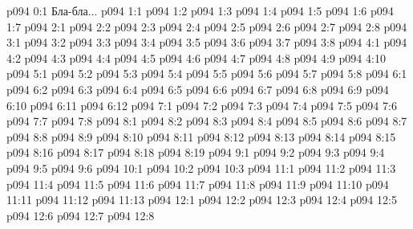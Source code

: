 \author{Мелхиседек}
\vs p094 0:1  Бла-бла...
\vs p094 1:1 
\vs p094 1:2 
\vs p094 1:3 
\vs p094 1:4 
\vs p094 1:5 \pc 
\vs p094 1:6 \pc 
\vs p094 1:7 
\vs p094 2:1 
\vs p094 2:2 
\vs p094 2:3 
\vs p094 2:4 
\vs p094 2:5 \pc 
\vs p094 2:6 \pc 
\vs p094 2:7 
\vs p094 2:8 \pc 
{}
\vs p094 3:1 
\vs p094 3:2 
\vs p094 3:3 
\vs p094 3:4 
\vs p094 3:5 
\vs p094 3:6 
\vs p094 3:7 
\vs p094 3:8 
\vs p094 4:1 
\vs p094 4:2 \pc 
\vs p094 4:3 
\vs p094 4:4 
\vs p094 4:5 
\vs p094 4:6 
\vs p094 4:7 
\vs p094 4:8 \pc 
\vs p094 4:9 
\vs p094 4:10 
\vs p094 5:1 
\vs p094 5:2 
\vs p094 5:3 
\vs p094 5:4 
\vs p094 5:5 
\vs p094 5:6 \pc 
\vs p094 5:7 
\vs p094 5:8 \pc 
{}
\vs p094 6:1 
\vs p094 6:2 
\vs p094 6:3 \pc 
\vs p094 6:4 
\vs p094 6:5 
\vs p094 6:6 
\vs p094 6:7 
\vs p094 6:8 
\vs p094 6:9 \pc 
\vs p094 6:10 
\vs p094 6:11 
\vs p094 6:12 
\vs p094 7:1 
\vs p094 7:2 
\vs p094 7:3 
\vs p094 7:4 
\vs p094 7:5 
\vs p094 7:6 
\vs p094 7:7 \pc 
\vs p094 7:8 
\vs p094 8:1 
\vs p094 8:2 
\vs p094 8:3 \pc 
\vs p094 8:4 
\vs p094 8:5 
\vs p094 8:6 
\vs p094 8:7 
\vs p094 8:8 \pc 
\vs p094 8:9 \pc 
\vs p094 8:10 
\vs p094 8:11 
\vs p094 8:12 
\vs p094 8:13 
\vs p094 8:14 
\vs p094 8:15 \pc 
\vs p094 8:16 \pc 
\vs p094 8:17 
\vs p094 8:18 
\vs p094 8:19 
\vs p094 9:1 
\vs p094 9:2 
\vs p094 9:3 
\vs p094 9:4 
\vs p094 9:5 
\vs p094 9:6 
\vs p094 10:1 
\vs p094 10:2 
\vs p094 10:3 
\vs p094 11:1 
\vs p094 11:2 \pc 
\vs p094 11:3 
\vs p094 11:4 \pc 
\vs p094 11:5 
\vs p094 11:6 
\vs p094 11:7 
\vs p094 11:8 
\vs p094 11:9 
\vs p094 11:10 
\vs p094 11:11 
\vs p094 11:12 \pc 
\vs p094 11:13 
\vs p094 12:1 
\vs p094 12:2 \pc 
\vs p094 12:3 
\vs p094 12:4 
\vs p094 12:5 
\vs p094 12:6 
\vs p094 12:7 \pc 
\vsetoff
\vs p094 12:8 
\quizlink
